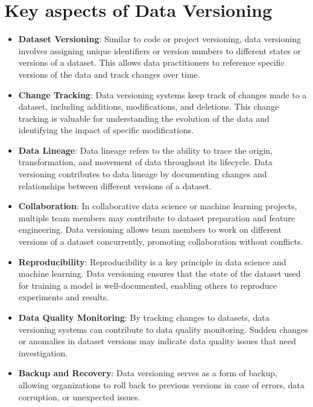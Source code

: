 \documentclass[12pt]{article}
\begin{document}
\newpage

\section{Key aspects of Data Versioning}
\begin{itemize}
    \item \textbf{Dataset Versioning}: Similar to code or project versioning, data versioning involves assigning unique identifiers or version numbers to different states or versions of a dataset. This allows data practitioners to reference specific versions of the data and track changes over time.

    \item \textbf{Change Tracking}: Data versioning systems keep track of changes made to a dataset, including additions, modifications, and deletions. This change tracking is valuable for understanding the evolution of the data and identifying the impact of specific modifications.

    \item \textbf{Data Lineage}: Data lineage refers to the ability to trace the origin, transformation, and movement of data throughout its lifecycle. Data versioning contributes to data lineage by documenting changes and relationships between different versions of a dataset.

    \item \textbf{Collaboration}: In collaborative data science or machine learning projects, multiple team members may contribute to dataset preparation and feature engineering. Data versioning allows team members to work on different versions of a dataset concurrently, promoting collaboration without conflicts.

    \item \textbf{Reproducibility}: Reproducibility is a key principle in data science and machine learning. Data versioning ensures that the state of the dataset used for training a model is well-documented, enabling others to reproduce experiments and results.

    \item \textbf{Data Quality Monitoring}: By tracking changes to datasets, data versioning systems can contribute to data quality monitoring. Sudden changes or anomalies in dataset versions may indicate data quality issues that need investigation.

    \item \textbf{Backup and Recovery}: Data versioning serves as a form of backup, allowing organizations to roll back to previous versions in case of errors, data corruption, or unexpected issues.
\end{itemize}
\end{document}
